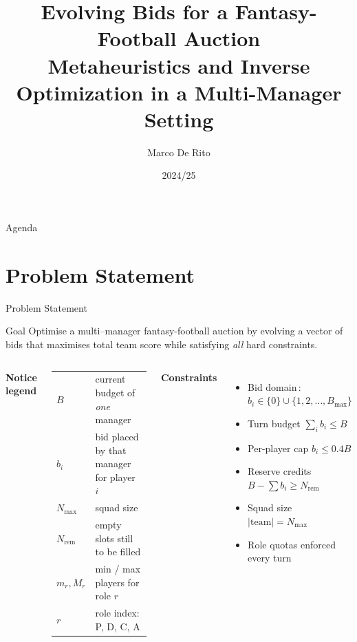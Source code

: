 \documentclass[aspectratio=169]{beamer}
\title[Evolving Bids]{Evolving Bids for a Fantasy-Football Auction\\
	\small Metaheuristics and Inverse Optimization in a Multi-Manager Setting}
\author{Marco De Rito}
\institute{University of Trieste}
\date{2024/25}
\begin{document}
	
	\begin{frame}[plain]
		\titlepage
	\end{frame}
	
	\begin{frame}{Agenda}
		\tableofcontents
	\end{frame}
	
	\section{Problem Statement}
	\begin{frame}{Problem Statement}
		\scriptsize
		\begin{block}{Goal}
			Optimise a multi–manager fantasy-football auction by evolving a
			vector of \alert{bids} that maximises total team score while
			satisfying \emph{all} hard constraints.
		\end{block}
		
		\begin{columns}[T,onlytextwidth]
			\textbf{Notice legend}
			\vspace{0.3em}
			\begin{tabular}{@{}ll@{}}
				$B$ & current budget of \emph{one} manager\\
				$b_i$ & bid placed by that manager for player $i$\\
				$N_{\max}$ &  squad size\\
				$N_{\text{rem}}$ & empty slots still to be filled\\
				$m_r, M_r$ & min / max players for role $r$\\
				$r$ & role index: P, D, C, A\\
			\end{tabular}
				\textbf{Constraints}
			\begin{itemize}
			\item {Bid domain}\,: $b_i \in \{0\}\cup\{1,2,\dots,B_{\max}\}$
				\item Turn budget $\sum_i b_i \le B$
				\item Per-player cap $b_i \le 0.4B$
				\item Reserve credits $B - \sum b_i \ge N_{\text{rem}}$
				\item Squad size $|\text{team}| = N_{\max}$
				\item Role quotas enforced every turn
			\end{itemize}
			
			\vspace{1em}


\end{columns}
\end{frame}
\end{document}
